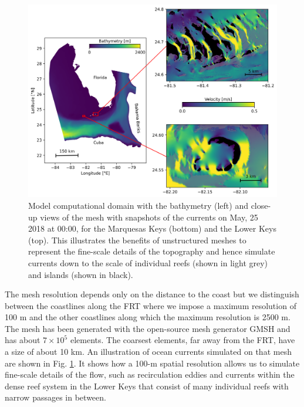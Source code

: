 \documentclass[utf8]{frontiersSCNS}
\begin{document}
\begin{figure}
    \centering
    \includegraphics[width=.8\textwidth]{figures/setup_3.png}
    \caption{Model computational domain with the bathymetry (left) and close-up views of the mesh with snapshots of the currents on May, 25 2018 at 00:00, for the Marquesas Keys (bottom) and the Lower Keys (top). This illustrates the benefits of unstructured meshes to represent the fine-scale details of the topography and hence simulate currents down to the scale of individual reefs (shown in light grey) and islands (shown in black).}
    \label{fig:setup}
\end{figure}

The mesh resolution depends only on the distance to the coast but we distinguish between the coastlines along the FRT where we impose a maximum resolution of 100 m and the other coastlines along which the maximum resolution is 2500 m. The mesh has been generated with the open-source mesh generator GMSH \citep{Geuzaine2009} and has about $7 \times 10^5$ elements. The coarsest elements, far away from the FRT, have a size of about 10 km. An illustration of ocean currents simulated on that mesh are shown in Fig. \ref{fig:setup}. It shows how a 100-m spatial resolution allows us to simulate fine-scale details of the flow, such as recirculation eddies and currents within the dense reef system in the Lower Keys that consist of many individual reefs with narrow passages in between. 
\end{document}
